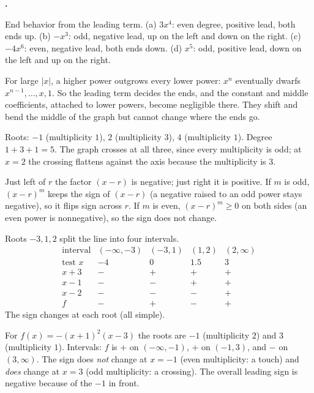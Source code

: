 \documentclass[12pt]{book}
\newcounter{soln}[section]
\newenvironment{solutions}{%
  \setcounter{soln}{0}%
  \begin{list}{\textbf{\arabic{soln}.}}{%
    \usecounter{soln}\setlength{\leftmargin}{2.2em}\setlength{\itemsep}{10pt}}%
}{\end{list}}
\begin{document}
\begin{solutions}
\item End behavior from the leading term. (a) $3x^4$: even degree, positive lead, both
ends up. (b) $-x^3$: odd, negative lead, up on the left and down on the right.
(c) $-4x^6$: even, negative lead, both ends down. (d) $x^5$: odd, positive lead, down
on the left and up on the right.

\item For large $|x|$, a higher power outgrows every lower power: $x^n$ eventually
dwarfs $x^{n-1}, \dots, x, 1$. So the leading term decides the ends, and the constant
and middle coefficients, attached to lower powers, become negligible there. They shift
and bend the middle of the graph but cannot change where the ends go.

\item Roots: $-1$ (multiplicity $1$), $2$ (multiplicity $3$), $4$ (multiplicity $1$).
Degree $1+3+1=5$. The graph crosses at all three, since every multiplicity is odd; at
$x=2$ the crossing flattens against the axis because the multiplicity is $3$.

\item Just left of $r$ the factor $(x-r)$ is negative; just right it is positive. If
$m$ is odd, $(x-r)^m$ keeps the sign of $(x-r)$ (a negative raised to an odd power
stays negative), so it flips sign across $r$. If $m$ is even, $(x-r)^m\ge0$ on both
sides (an even power is nonnegative), so the sign does not change.

\item Roots $-3,1,2$ split the line into four intervals.
\[
\begin{array}{c|cccc}
\text{interval} & (-\infty,-3) & (-3,1) & (1,2) & (2,\infty)\\\hline
\text{test }x & -4 & 0 & 1.5 & 3\\
x+3 & - & + & + & +\\
x-1 & - & - & + & +\\
x-2 & - & - & - & +\\\hline
f & - & + & - & +
\end{array}
\]
The sign changes at each root (all simple).

\item For $f(x)=-(x+1)^2(x-3)$ the roots are $-1$ (multiplicity $2$) and $3$
(multiplicity $1$). Intervals: $f$ is $+$ on $(-\infty,-1)$, $+$ on $(-1,3)$, and $-$
on $(3,\infty)$. The sign does \emph{not} change at $x=-1$ (even multiplicity: a
touch) and \emph{does} change at $x=3$ (odd multiplicity: a crossing). The overall
leading sign is negative because of the $-1$ in front.


\end{solutions}
\end{document}
